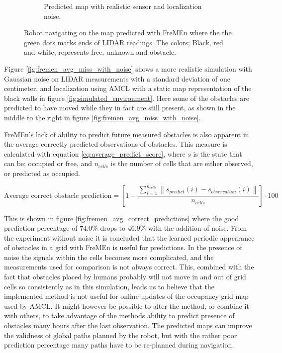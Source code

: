 \begin{figure}[htbp]
\begin{subfigure}[t]{0.49\textwidth}
        \caption{Predicted map with realistic sensor and localization noise.}
        \label{fig:fremen_sim_with_noise}
    \end{subfigure}
    \caption{Robot navigating on the map predicted with FreMEn where the the green dots marks ends of LIDAR readings. The colors; Black, red and white, represents free, unknown and obstacle.}
\end{figure}

Figure \ref{fig:fremen_avg_miss_with_noise} shows a more realistic simulation with Gaussian noise on LIDAR measurements with a standard deviation of one centimeter, and localization using AMCL with a static map representation of the black walls in figure \ref{fig:simulated_environment}.
Here some of the obstacles are predicted to have moved while they in fact are still present, as shown in the middle to the right in figure \ref{fig:fremen_avg_miss_with_noise}.

FreMEn's lack of ability to predict future measured obstacles is also apparent in the average correctly predicted observations of obstacles. This measure is calculated with equation \ref{eq:average_predict_score}, where $s$ is the state that can be; occupied or free, and $n_{cells}$ is the number of cells that are either observed, or predicted as occupied.

\begin{equation}
\text{Average correct obstacle prediction} = \left[1- \frac{\sum\limits_{i=1}^{n_{cells}} \left\|s_{predict}(i)-s_{observation}(i)\right\|}{n_{cells}}
\right]\cdot 100
\label{eq:average_predict_score}
\end{equation} 

This is shown in figure \ref{fig:fremen_avg_correct_predictions} where the good prediction percentage of $74.0\%$ drops to $46.9\%$ with the addition of noise.
From the experiment without noise it is concluded that the learned periodic appearance of obstacles in a grid with FreMEn is useful for predictions.
In the presence of noise the signals within the cells becomes more complicated, and the measurements used for comparison is not always correct.
This, combined with the fact that obstacles placed by humans probably will not move in and out of grid cells so consistently as in this simulation, leads us to believe that the implemented method is not useful for online updates of the occupancy grid map used by AMCL.
It might however be possible to alter the method, or combine it with others, to take advantage of the methods ability to predict presence of obstacles many hours after the last observation.
The predicted maps can improve the validness of global paths planned by the robot, but with the rather poor prediction percentage many paths have to be re-planned during navigation.

